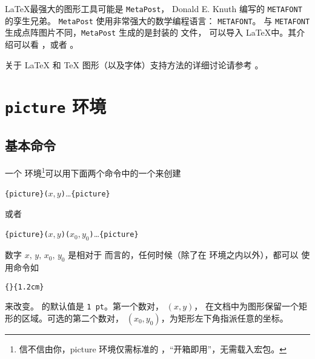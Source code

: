 \LaTeX 最强大的图形工具可能是 \texttt{MetaPost}， Donald E.
Knuth 编写的 \texttt{METAFONT} 的孪生兄弟。
\texttt{MetaPost} 使用非常强大的数学编程语言： \texttt{METAFONT}。
与 \texttt{METAFONT} 生成点阵图片不同，\texttt{MetaPost} 生成的是封装的 \PSi{} 文件，
可以导入 \LaTeX 中。其介绍可以看 \hobby，或者 \cite{ursoswald}。

%

关于 \LaTeX{} 和 \TeX{} 图形（以及字体）支持方法的详细讨论请参考 \hoenig。

\section{\texttt{picture} 环境}


\subsection{基本命令}

一个  环境\footnote{信不信由你，picture 环境仅需标准的 \LaTeXe{}，“开箱即用”，无需载入宏包。}可以用下面两个命令中的一个来创建
\begin{lscommand}
\verb|{picture}(|$x,y$\verb|)|\ldots{}\verb|{picture}|
\end{lscommand}
\noindent 或者
\begin{lscommand}
\verb|{picture}(|$x,y$\verb|)(|$x_0,y_0$\verb|)|\ldots{}\verb|{picture}|
\end{lscommand}
数字 $x,\,y,\,x_0,\,y_0$ 是相对于  而言的，任何时候（除了在  环境之内以外），都可以
使用命令如
\begin{lscommand}
\verb|{|\verb|}{1.2cm}|
\end{lscommand}
\noindent
来改变。 的默认值是 \texttt{1 pt}。第一个数对，
$(x,y)$， 在文档中为图形保留一个矩形的区域。可选的第二个数对，
$(x_0,y_0)$，为矩形左下角指派任意的坐标。

